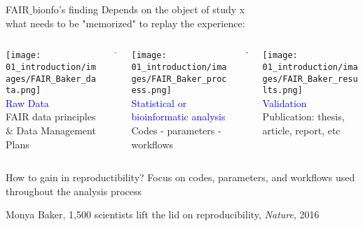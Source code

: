 \begin{frame}{FAIR$\_$bionfo's finding}
Depends on the object of study x \\
\quad \quad \quad what needs to be "memorized" to replay the experience:
\begin{columns}[t]
  \begin{column}{.3\textwidth}\begin{center}
        \texttt{[image: 01\_introduction/images/FAIR\_Baker\_data.png]}\\
        \textcolor{blue}{Raw Data}\\FAIR data principles $\&$ Data Management Plans
      \end{center}\end{column}
      \begin{column}{.05\textwidth}\begin{center}
         $\rightarrow$
      \end{center}\end{column}
      \begin{column}{.3\textwidth}\begin{center}
         \texttt{[image: 01\_introduction/images/FAIR\_Baker\_process.png]}\\
         \textcolor{blue}{Statistical or bioinformatic analysis}\\Codes - parameters - workflows
      \end{center}\end{column}
      \begin{column}{.05\textwidth}\begin{center}
         $\rightarrow$
      \end{center}\end{column}
      \begin{column}{0.3\textwidth}\begin{center}
         \texttt{[image: 01\_introduction/images/FAIR\_Baker\_results.png]}\\
         \textcolor{blue}{Validation}\\Publication: thesis, article, report, etc
        \end{center}\end{column}
  \end{columns}
  \begin{block}{How to gain in reproductibility?}
   Focus on codes, parameters, and workflows used throughout the analysis process
  \end{block}
  \vfill
  \tiny{Monya Baker, 1,500 scientists lift the lid on reproducibility, \textit{Nature}, 2016}
\end{frame}
